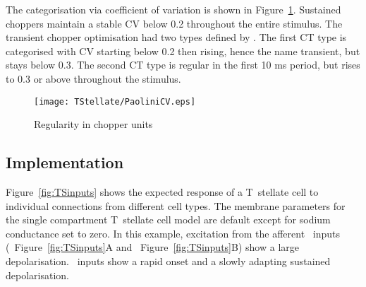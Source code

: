 

The categorisation via coefficient of variation is shown in Figure~\ref{fig:PaoliniCVdata}.
Sustained choppers maintain a stable CV below 0.2 throughout the entire stimulus. The transient chopper optimisation had two types defined by \citep{PaoliniClareyEtAl:2005}.
The first CT type is categorised with CV starting below 0.2 then rising, hence the name transient, but stays below 0.3.
The second CT type is regular in the first 10 ms period, but rises to 0.3 or above throughout the stimulus.

\begin{figure}[htb]
\centering%
\texttt{[image: TStellate/PaoliniCV.eps]}
\caption{Regularity in chopper units \citep[Data reproduced from Fig.~2,~][]{PaoliniClareyEtAl:2005}}
\label{fig:PaoliniCVdata}
\end{figure}


\subsection{Implementation}




Figure~\ref{fig:TSinputs} shows the expected response of a T~stellate cell to individual connections from different cell types.
The membrane parameters for the single compartment T~stellate cell model are default except for sodium conductance set to zero.
In this example, excitation from the afferent \ANF~inputs (\LSR~Figure~\ref{fig:TSinputs}A and \HSR~Figure~\ref{fig:TSinputs}B) show a large depolarisation.
\HSR~inputs show a rapid onset and a slowly adapting sustained depolarisation.




